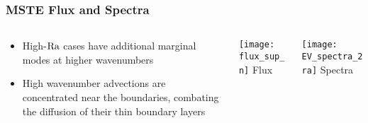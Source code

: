          
        
        

    

\begin{frame}[fragile]
    \frametitle{MSTE Flux and Spectra}
    \begin{columns}
        \begin{column}{.28\textwidth}
            \begin{itemize}
                \item High-$\rm{Ra}$ cases have additional marginal modes at higher wavenumbers\newline
                
                \item High wavenumber advections are concentrated near the boundaries, combating the diffusion of their thin boundary layers
            \end{itemize}
        \end{column}
        \begin{column}{.28\textwidth}
            \centering
            \texttt{[image: flux\_sup\_n]}
            {Flux}
        \end{column}
        \begin{column}{.28\textwidth}
            \centering
            \texttt{[image: EV\_spectra\_2ra]}
            {Spectra}
        \end{column}
    \end{columns}
\end{frame}


